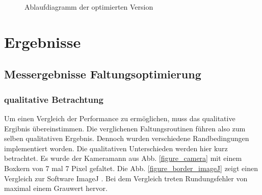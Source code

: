 \documentclass[a4paper,12pt]{article}
\begin{document}
\begin{figure}[htbp]
\caption{Ablaufdiagramm der optimierten Version}%
\label{figure_konverg_ablauf}
\end{figure}

\newpage
\section{Ergebnisse}
\subsection{Messergebnisse Faltungsoptimierung}\label{chp:mess_faltungen}

\subsubsection{qualitative Betrachtung}
Um einen Vergleich der Performance zu ermöglichen, muss das qualitative Ergibnis
übereinstimmen. Die verglichenen Faltungsroutinen führen also zum selben
qualitativen Ergebnis. Dennoch wurden verschiedene Randbedingungen implementiert
worden. Die qualitativen Unterschieden werden hier kurz betrachtet.
Es wurde der Kameramann aus
Abb. \ref{figure_camera} mit einem Boxkern von 7 mal 7 Pixel gefaltet.
Die Abb. \ref{figure_border_imageJ} zeigt einen Vergleich zur Software ImageJ
\cite{imageJ}.
Bei dem Vergleich treten Rundungsfehler von maximal einem Grauwert hervor.
\end{document}
